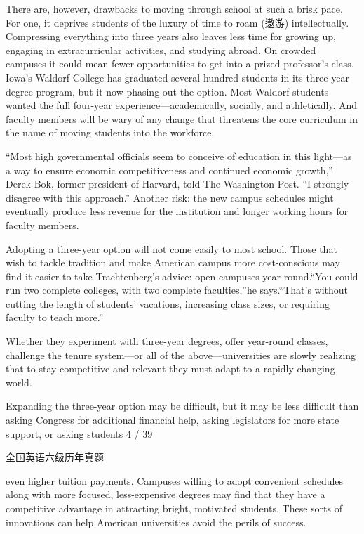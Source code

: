 \documentclass[UTF8,11pt]{ctexart}
\begin{document}
There are, however, drawbacks to moving through school at such a brisk pace. For one, it deprives students of the luxury of time to roam (遨游) intellectually. Compressing everything into three years also leaves less time for growing up, engaging in extracurricular activities, and studying abroad. On crowded campuses it could mean fewer opportunities to get into a prized professor’s class. Iowa’s Waldorf College has graduated several hundred students in its three-year degree program, but it now phasing out the option. Most Waldorf students wanted the full four-year experience—academically, socially, and athletically. And faculty members will be wary of any change that threatens the core curriculum in the name of moving students into the workforce.


“Most high governmental officials seem to conceive of education in this light—as a way to ensure economic competitiveness and continued economic growth,” Derek Bok, former president of Harvard, told The Washington Post. “I strongly disagree with this approach.” Another risk: the new campus schedules might eventually produce less revenue for the institution and longer working hours for faculty members.


Adopting a three-year option will not come easily to most school. Those that wish to tackle tradition and make American campus more cost-conscious may find it easier to take Trachtenberg’s advice: open campuses year-round.“You could run two complete colleges, with two complete faculties,”he says.“That’s without cutting the length of students’ vacations, increasing class sizes, or requiring faculty to teach more.”


Whether they experiment with three-year degrees, offer year-round classes, challenge the tenure system—or all of the above—universities are slowly realizing that to stay competitive and relevant they must adapt to a rapidly changing world.


Expanding the three-year option may be difficult, but it may be less difficult than asking Congress for additional financial help, asking legislators for more state support, or asking students 4 / 39


全国英语六级历年真题


even higher tuition payments. Campuses willing to adopt convenient schedules along with more focused, less-expensive degrees may find that they have a competitive advantage in attracting bright, motivated students. These sorts of innovations can help American universities avoid the perils of success.
\end{document}
